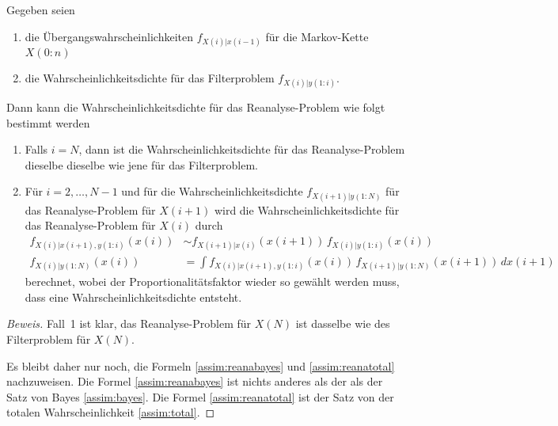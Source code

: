 \begin{satz}[Reanalyse]
Gegeben seien
\begin{enumerate}
\item
die Übergangswahrscheinlichkeiten $f_{X(i)|x(i-1)}$ für die
Markov-Kette $X(0:n)$
\item
die Wahrscheinlichkeitsdichte für das Filterproblem
$f_{X(i)|y(1:i)}$.
\end{enumerate}
Dann kann die Wahrscheinlichkeitsdichte für das Reanalyse-Problem wie folgt
bestimmt werden
\begin{enumerate}
\item Falls $i=N$, dann ist die Wahrscheinlichkeitsdichte für das
Reanalyse-Problem dieselbe dieselbe wie jene für das Filterproblem.
\item Für $i=2,\dots,N-1$ und für die Wahrscheinlichkeitsdichte 
$f_{X(i+1)|y(1:N)}$  für das Reanalyse-Problem für $X(i+1)$ 
wird die Wahrscheinlichkeitsdichte für das Reanalyse-Problem für $X(i)$
durch
\begin{align}
f_{X(i)|x(i+1),y(1:i)}(x(i))
&\sim
f_{X(i+1)|x(i)}(x(i+1))\, f_{X(i)|y(1:i)}(x(i))
\label{assim:reanabayes}
\\
f_{X(i)|y(1:N)}(x(i))
&=
\int f_{X(i)|x(i+1),y(1:i)}(x(i))\, f_{X(i+1)|y(1:N)}(x(i+1))\,dx(i+1)
\label{assim:reanatotal}
\end{align}
berechnet,
wobei der Proportionalitätsfaktor wieder so gewählt werden muss, dass
eine Wahrscheinlichkeitsdichte entsteht.
\end{enumerate}
\end{satz}

\begin{proof}[Beweis]
Fall~1 ist klar, das Reanalyse-Problem für $X(N)$ ist dasselbe wie des
Filterproblem für $X(N)$.

Es bleibt daher nur noch, die Formeln
\eqref{assim:reanabayes}
und
\eqref{assim:reanatotal}
nachzuweisen.
Die Formel
\eqref{assim:reanabayes}
ist nichts anderes als der 
als der Satz von Bayes
\eqref{assim:bayes}.
Die Formel 
\eqref{assim:reanatotal}
ist der Satz von der totalen Wahrscheinlichkeit
\eqref{assim:total}.
\end{proof}






